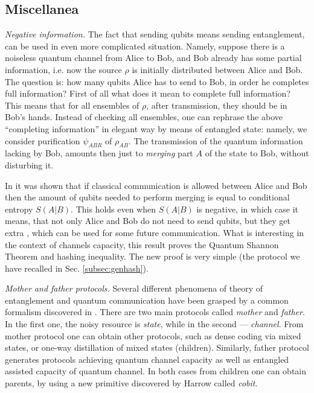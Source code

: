 \documentclass[twocolumn,aps,rmp]{revtex4}
\begin{document}
\subsection{Miscellanea}
{\it Negative information.} The fact that sending qubits means
sending entanglement, can be used in even more complicated
situation. Namely, suppose there is a noiseless quantum channel from
Alice to Bob, and Bob already has some partial information, i.e. now
the source $\rho$ is initially distributed between Alice and Bob.
The question is: how many qubits Alice has to send to Bob, in order
he completes full information? First of all what does it mean to
complete full information? This means that for all ensembles of
$\rho$, after transmission, they should be in Bob's hands.
Instead of checking all ensembles, one can rephrase
the above ``completing information'' in elegant
way by means of entangled state: namely, we consider purification
$\psi_{ABR}$ of $\rho_{AB}$. The transmission of the quantum
information lacking by Bob, amounts then just to {\it merging} part $A$ of
the state to Bob, without disturbing it.

In \cite{SW-nature,sw-long} it was shown that if classical
communication is allowed between Alice and Bob then the amount of
qubits needed to perform merging is equal to conditional entropy
$S(A|B)$. This holds even when $S(A|B)$ is negative, in which case
it means, that not only Alice and Bob do not need to send qubits,
but they get extra \eprpairs, which can be used for some future
communication. What is interesting in the context of channels
capacity, this result proves the Quantum Shannon Theorem and hashing
inequality.  The new proof is very simple (the protocol we have recalled in Sec. \ref{subsec:genhash}).



{\it Mother and father protocols.}
Several different phenomena of theory of entanglement
and quantum communication have been grasped by a
common formalism discovered in \cite{DevetakHW-family,DevetakHW2005-resource}.
There are two main protocols  called {\it mother} and {\it father}. In the first one,
the noisy resource is {\it state}, while in the second --- {\it channel}.
From mother protocol one can obtain other protocols, such as dense coding via
mixed states, or one-way distillation of mixed states (children).
Similarly, father protocol generates protocols achieving quantum
channel capacity as well as entangled assisted capacity of quantum
channel. In both cases  from children one can obtain parents, by
using a new primitive discovered by Harrow called {\it cobit}.
\end{document}
